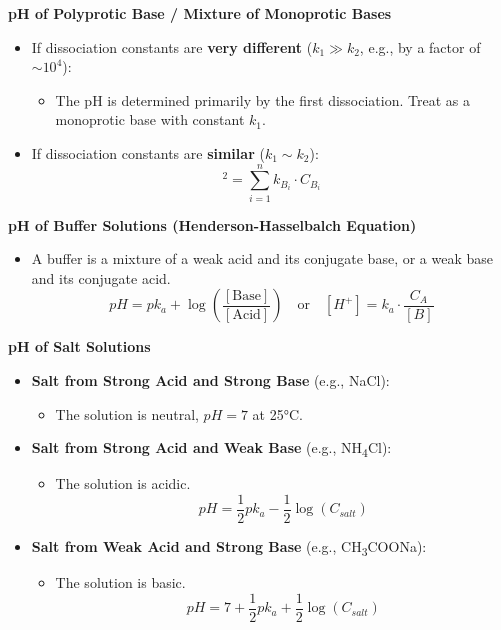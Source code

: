 \vspace{5mm}

\textbf{pH of Polyprotic Base / Mixture of Monoprotic Bases}
\begin{itemize}
    \item If dissociation constants are \textbf{very different} (\( k_1 \gg k_2 \), e.g., by a factor of \( \sim 10^4 \)):
     \begin{itemize}
        \item The pH is determined primarily by the first dissociation. Treat as a monoprotic base with constant \( k_1 \).
    \end{itemize}
    \item If dissociation constants are \textbf{similar} (\( k_1 \sim k_2 \)):
    \begin{equation}
    [OH^-]^2 = \sum_{i=1}^{n} k_{B_i} \cdot C_{B_i}
    \end{equation}
\end{itemize}

\vspace{5mm}

\textbf{pH of Buffer Solutions (Henderson-Hasselbalch Equation)}
\begin{itemize}
    \item A buffer is a mixture of a weak acid and its conjugate base, or a weak base and its conjugate acid.
    \begin{equation}
    pH = pk_a + \log\left(\frac{[\text{Base}]}{[\text{Acid}]}\right) \quad \text{or} \quad [H^+] = k_a \cdot \frac{C_A}{[B]}
    \end{equation}
\end{itemize}

\vspace{5mm}

\textbf{pH of Salt Solutions}
\begin{itemize}
    \item \textbf{Salt from Strong Acid and Strong Base} (e.g., NaCl):
    \begin{itemize}
        \item The solution is neutral, \( pH = 7 \) at 25°C.
    \end{itemize}
    \item \textbf{Salt from Strong Acid and Weak Base} (e.g., NH\textsubscript{4}Cl):
     \begin{itemize}
        \item The solution is acidic.
        \begin{equation}
        pH = \frac{1}{2} pk_a - \frac{1}{2} \log(C_{salt})
        \end{equation}
    \end{itemize}
    \item \textbf{Salt from Weak Acid and Strong Base} (e.g., CH\textsubscript{3}COONa):
     \begin{itemize}
        \item The solution is basic.
        \begin{equation}
        pH = 7 + \frac{1}{2} pk_a + \frac{1}{2} \log(C_{salt})
        \end{equation}
    \end{itemize}
\end{itemize}

